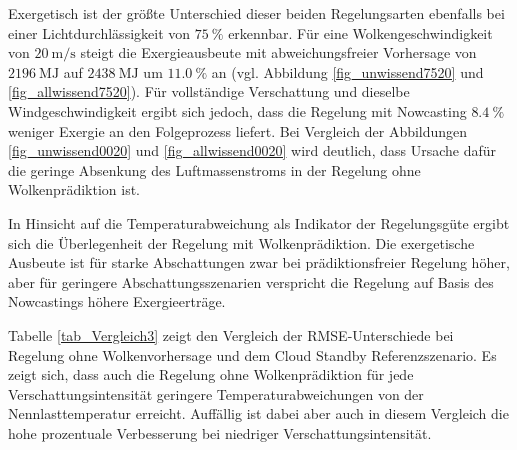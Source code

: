 Exergetisch ist der größte Unterschied dieser beiden Regelungsarten ebenfalls bei einer Lichtdurchlässigkeit von $\SI{75}{\percent}$ erkennbar.
Für eine Wolkengeschwindigkeit von $\SI{20}{\metre\per\second}$ steigt die Exergieausbeute mit abweichungsfreier Vorhersage von $\SI{2196}{\mega\joule}$ auf $\SI{2438}{\mega\joule}$ um $\SI{11.0}{\percent}$ an (vgl. Abbildung \ref{fig_unwissend7520} und \ref{fig_allwissend7520}).
Für vollständige Verschattung und dieselbe Windgeschwindigkeit ergibt sich jedoch, dass die Regelung mit Nowcasting $\SI{8.4}{\percent}$ weniger Exergie an den Folgeprozess liefert.
Bei Vergleich der Abbildungen \ref{fig_unwissend0020} und \ref{fig_allwissend0020} wird deutlich, dass Ursache dafür die geringe Absenkung des Luftmassenstroms in der Regelung ohne Wolkenprädiktion ist.

In Hinsicht auf die Temperaturabweichung als Indikator der Regelungsgüte ergibt sich die Überlegenheit der Regelung mit Wolkenprädiktion.
Die exergetische Ausbeute ist für starke Abschattungen zwar bei prädiktionsfreier Regelung höher, aber für geringere Abschattungsszenarien verspricht die Regelung auf Basis des Nowcastings höhere Exergieerträge.

Tabelle \ref{tab_Vergleich3} zeigt den Vergleich der RMSE-Unterschiede bei Regelung ohne Wolkenvorhersage und dem Cloud Standby Referenzszenario.
Es zeigt sich, dass auch die Regelung ohne Wolkenprädiktion für jede Verschattungsintensität geringere Temperaturabweichungen von der Nennlasttemperatur erreicht.
Auffällig ist dabei aber auch in diesem Vergleich die hohe prozentuale Verbesserung bei niedriger Verschattungsintensität.

